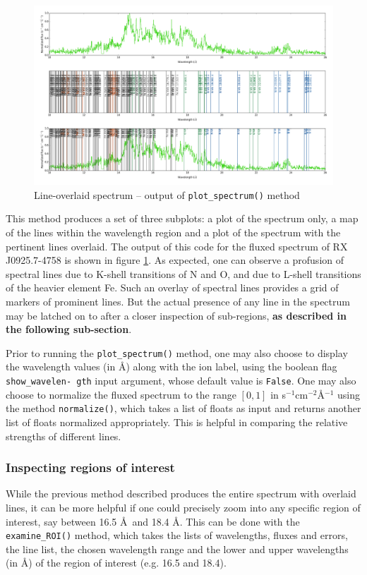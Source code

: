                 \begin{figure}[h!]
    				\centering
    				\caption{Line-overlaid spectrum -- output of \texttt{plot\_spectrum()} method}
    				\label{fig:line-overlay}
    				\includegraphics[width=\textwidth]{images/mrvel_line-overlay}
			    \end{figure}
                
                This method produces a set of three subplots: a plot of the spectrum only, a map of the lines within the wavelength region and a plot of the spectrum with the pertinent lines overlaid. The output of this code for the fluxed spectrum of RX J0925.7-4758 is shown in figure \ref{fig:line-overlay}. As expected, one can observe a profusion of spectral lines due to K-shell transitions of N and O, and due to L-shell transitions of the heavier element Fe. Such an overlay of spectral lines provides a grid of markers of prominent lines. But the actual presence of any line in the spectrum may be latched on to after a closer inspection of sub-regions, \textbf{as described in the following sub-section}.
                
                Prior to running the \texttt{plot\_spectrum()} method, one may also choose to display the wavelength values (in \AA) along with the ion label, using the boolean flag \texttt{show\_wavelen- gth} input argument, whose default value is \texttt{False}. One may also choose to normalize the fluxed spectrum to the range $[0, 1]$ in s$^{-1}$cm$^{-2}$\AA$^{-1}$ using the method \texttt{normalize()}, which takes a list of floats as input and returns another list of floats normalized appropriately. This is helpful in comparing the relative strengths of different lines.
            
            \subsubsection{Inspecting regions of interest} \label{tool:rgs-files:demonstration:roi}
                While the previous method described produces the entire spectrum with overlaid lines, it can be more helpful if one could precisely zoom into any specific region of interest, say between 16.5 \AA~and 18.4 \AA. This can be done with the \texttt{examine\_ROI()} method, which takes the lists of wavelengths, fluxes and errors, the line list, the chosen wavelength range and the lower and upper wavelengths (in \AA) of the region of interest (e.g. 16.5 and 18.4).
                
